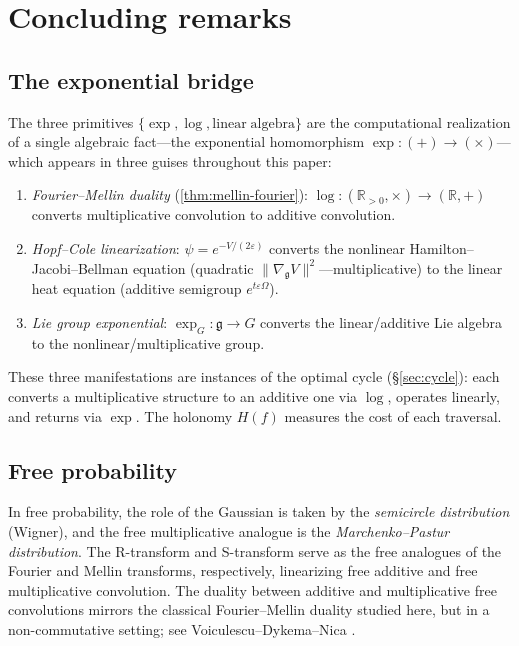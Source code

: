 \documentclass[12pt]{amsart}
\theoremstyle{definition}
\theoremstyle{remark}
\newcommand{\R}{\mathbb{R}}
\newcommand{\Rpos}{\mathbb{R}_{>0}}
\begin{document}
\section{Concluding remarks}\label{sec:concluding}

\subsection*{The exponential bridge}

The three primitives $\{\exp,\log,\mathrm{linear\;algebra}\}$ are the
computational realization of a single algebraic fact---the exponential
homomorphism $\exp\colon (+) \to (\times)$---which appears in three guises
throughout this paper:
\begin{enumerate}[label=\textup{(\arabic*)}]
\item \emph{Fourier--Mellin duality}
      (\cref{thm:mellin-fourier}):
      $\log\colon (\Rpos, \times) \to (\R, +)$ converts multiplicative
      convolution to additive convolution.
\item \emph{Hopf--Cole linearization}:
      $\psi = e^{-V/(2\varepsilon)}$ converts the nonlinear Hamilton--Jacobi--Bellman equation
      (quadratic $\|\nabla_{\mathfrak{g}} V\|^2$---multiplicative)
      to the linear heat equation
      (additive semigroup $e^{t\varepsilon\Omega}$).
\item \emph{Lie group exponential}:
      $\exp_G\colon \mathfrak{g} \to G$ converts the linear/additive
      Lie algebra to the nonlinear/multiplicative group.
\end{enumerate}
These three manifestations are instances of the optimal cycle (\S\ref{sec:cycle}): each converts a multiplicative structure to an additive one via $\log$, operates linearly, and returns via $\exp$. The holonomy $H(f)$ measures the cost of each traversal.

\subsection*{Free probability}
In free probability, the role of the Gaussian is taken by the \emph{semicircle distribution} (Wigner), and the free multiplicative analogue is the \emph{Marchenko--Pastur distribution}. The R-transform and S-transform serve as the free analogues of the Fourier and Mellin transforms, respectively, linearizing free additive and free multiplicative convolution. The duality between additive and multiplicative free convolutions mirrors the classical Fourier--Mellin duality studied here, but in a non-commutative setting; see Voiculescu--Dykema--Nica \cite{VDN}.
\end{document}
